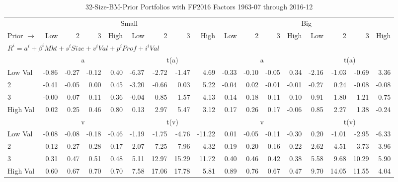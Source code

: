 
\begin{table}[!ht]
\footnotesize
\centering
\caption{32-Size-BM-Prior Portfolios with FF2016 Factors 1963-07 through 2016-12}
\begin{tabular}{lrrrrrrrrrrrrrrrr}
  \toprule
    & \multicolumn{8}{c}{Small} & \multicolumn{8}{c}{Big} \\
      \cmidrule(r){2-9} \cmidrule(r){10-17}
    Prior $\rightarrow$ & Low & 2 & 3 & High & Low & 2 & 3 & High & Low & 2 & 3 & High & Low & 2 & 3 & High \\ 
  \midrule
  \multicolumn{17}{l}{$R^i=a^i+\beta^iMkt+s^iSize+v^iVal+p^iProf+i^iVal$} \\

  
    
      & \multicolumn{4}{c}{a} & \multicolumn{4}{c}{t(a)}
    
      & \multicolumn{4}{c}{a} & \multicolumn{4}{c}{t(a)}
    
    \\
      \cmidrule(r){2-5} \cmidrule(r){6-9} \cmidrule(r){10-13} \cmidrule(r){14-17}

    Low Val   & -0.86  & -0.27  & -0.12  & 0.40  & -6.37  & -2.72  & -1.47  & 4.69  & -0.33  & -0.10  & -0.05  & 0.34  & -2.16  & -1.03  & -0.69  & 3.36  \\
           2  & -0.41  & -0.05  & 0.00  & 0.45  & -3.20  & -0.66  & 0.03  & 5.22  & -0.04  & 0.02  & -0.01  & -0.01  & -0.27  & 0.24  & -0.08  & -0.08  \\
           3  & -0.00  & 0.07  & 0.11  & 0.36  & -0.04  & 0.85  & 1.57  & 4.13  & 0.14  & 0.18  & 0.11  & 0.10  & 0.91  & 1.80  & 1.21  & 0.75  \\
    High Val  & 0.02  & 0.25  & 0.46  & 0.80  & 0.13  & 2.97  & 5.47  & 3.12  & 0.17  & 0.26  & 0.17  & -0.06  & 0.85  & 2.27  & 1.38  & -0.24  \\

  
    
      & \multicolumn{4}{c}{v} & \multicolumn{4}{c}{t(v)}
    
      & \multicolumn{4}{c}{v} & \multicolumn{4}{c}{t(v)}
    
    \\
      \cmidrule(r){2-5} \cmidrule(r){6-9} \cmidrule(r){10-13} \cmidrule(r){14-17}

    Low Val   & -0.08  & -0.08  & -0.18  & -0.46  & -1.19  & -1.75  & -4.76  & -11.22  & 0.01  & -0.05  & -0.11  & -0.30  & 0.20  & -1.01  & -2.95  & -6.33  \\
           2  & 0.12  & 0.27  & 0.28  & 0.17  & 2.07  & 7.25  & 7.96  & 4.32  & 0.19  & 0.20  & 0.16  & 0.22  & 2.62  & 4.51  & 3.73  & 3.96  \\
           3  & 0.31  & 0.47  & 0.51  & 0.48  & 5.11  & 12.97  & 15.29  & 11.72  & 0.40  & 0.46  & 0.42  & 0.38  & 5.58  & 9.68  & 10.29  & 5.90  \\
    High Val  & 0.60  & 0.67  & 0.70  & 0.70  & 7.58  & 17.06  & 17.78  & 5.81  & 0.89  & 0.76  & 0.67  & 0.47  & 9.70  & 14.05  & 11.55  & 4.04  \\


\end{tabular}
\end{table}
